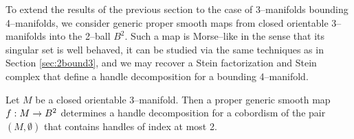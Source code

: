\label{sec:3bound4}

To extend the results of the previous section to the case of 3--manifolds bounding 4--manifolds, we consider generic proper smooth maps from closed orientable 3--manifolds into the 2--ball $B^2$.
Such a map is Morse--like in the sense that its singular set is well behaved, it can be studied via the same techniques as in Section \ref{sec:2bound3}, and we may recover a Stein factorization and Stein complex that define a handle decomposition for a bounding 4--manifold.

\begin{theorem}
	\label{thm:3bound4}
	Let $M$ be a closed orientable 3--manifold.
	Then a proper generic smooth map $f:M\to B^2$ determines a handle decomposition for a cobordism of the pair $(M,\emptyset)$ that contains handles of index at most 2.
\end{theorem}


